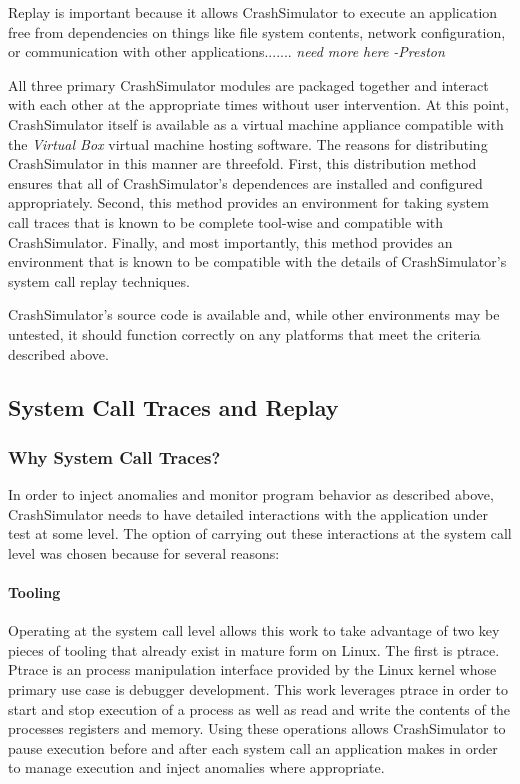     Replay is important because it allows CrashSimulator to execute an application free from dependencies on things like
    file system contents, network configuration, or communication with other applications....... \emph{need more here
      -Preston}

    All three primary CrashSimulator modules are packaged together and interact with each other at the appropriate times
    without user intervention. At this point, CrashSimulator itself is available as a virtual machine appliance
    compatible with the \emph{Virtual Box} virtual machine hosting software. The reasons for distributing CrashSimulator
    in this manner are threefold. First, this distribution method ensures that all of CrashSimulator's dependences are
    installed and configured appropriately. Second, this method provides an environment for taking system call traces
    that is known to be complete tool-wise and compatible with CrashSimulator. Finally, and most importantly, this
    method provides an environment that is known to be compatible with the details of CrashSimulator's system call
    replay techniques.

    CrashSimulator's source code is available and, while other environments may be untested, it should function
    correctly on any platforms that meet the criteria described above.

    \subsection{System Call Traces and Replay}

        \subsubsection{Why System Call Traces?}

        In order to inject anomalies and monitor program behavior as described above, CrashSimulator needs to have detailed
        interactions with the application under test at some level.  The option of carrying out these interactions at the
        system call level was chosen because for several reasons:

        \paragraph{Tooling}

        Operating at the system call level allows this work to take advantage of two key pieces of tooling that already
        exist in mature form on Linux.  The first is ptrace. Ptrace is an process manipulation interface provided by the
        Linux kernel whose primary use case is debugger development.  This work leverages ptrace in order to start and stop
        execution of a process as well as read and write the contents of the processes registers and memory.  Using these
        operations allows CrashSimulator to pause execution before and after each system call an application makes in order
        to manage execution and inject anomalies where appropriate.

